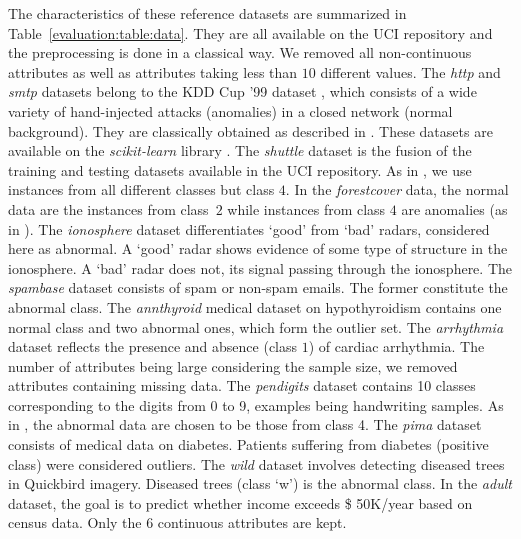 


The characteristics of these reference datasets are summarized in Table~\ref{evaluation:table:data}. They are all available on the UCI repository \cite{Lichman2013} and the preprocessing is done in a classical way. %
We removed all non-continuous attributes as well as attributes taking less than $10$ different values.
%
The \emph{http} and \emph{smtp} datasets belong to the KDD Cup '99 dataset \cite{KDD99,Tavallaee2009}, which consists of a wide variety of hand-injected  attacks (anomalies) in a closed network (normal background). They are classically obtained as described in \cite{Yamanishi2000}. These datasets are available on the \emph{scikit-learn} library \cite{sklearn2011}.
The \emph{shuttle} dataset is the fusion of the training and testing datasets available in the UCI repository. As in \cite{Liu2008}, we use instances from all different classes but class $4$. %
In the \emph{forestcover} data, the normal data are the instances from class~$2$ while instances from class $4$ are anomalies (as in \cite{Liu2008}). %
The \emph{ionosphere} dataset differentiates `good' from `bad' radars, considered here as abnormal. A `good' radar shows evidence of some type of structure in the ionosphere. A `bad' radar does not, its signal passing through the ionosphere.
The \emph{spambase} dataset consists of spam or non-spam emails. The former constitute the abnormal class.
The \emph{annthyroid} medical dataset on hypothyroidism contains one normal class and two abnormal ones, which form the outlier set.
The \emph{arrhythmia} dataset reflects the presence and absence (class $1$) of cardiac arrhythmia. The number of attributes being large considering the sample size, we removed attributes containing missing data.
The \emph{pendigits} dataset contains 10 classes corresponding to the digits from 0 to 9, examples being handwriting samples. As in \cite{Schubert2012}, the abnormal data are chosen to be those from class 4.
The \emph{pima} dataset consists of medical data on diabetes. Patients suffering from diabetes (positive class) were considered outliers.
The \emph{wild} dataset involves detecting diseased trees in Quickbird imagery. Diseased trees (class `w') is the abnormal class.
In the \emph{adult} dataset, the goal is to predict whether income exceeds \$ 50K/year based on census data. Only the 6 continuous attributes are kept.

